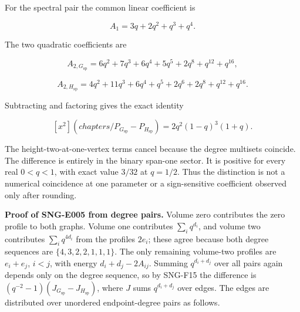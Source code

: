 \documentclass[
  11pt,
  a4paper,
]{report}
\begin{document}
For the spectral pair the common linear coefficient is

\[
A_1=3q+2q^2+q^3+q^4.
\]

The two quadratic coefficients are

\[
A_{2,G_{\mathrm{sp}}}=6q^2+7q^3+6q^4+5q^5+2q^8+q^{12}+q^{16},
\]

\[
A_{2,H_{\mathrm{sp}}}=4q^2+11q^3+6q^4+q^5+2q^6+2q^8+q^{12}+q^{16}.
\]

Subtracting and factoring gives the exact identity

\[
\boxed{[x^2](chapters/P_{G_{\mathrm{sp}}}-P_{H_{\mathrm{sp}}})
=2q^2(1-q)^3(1+q).}
\tag{SNG-E005}
\]

The height-two-at-one-vertex terms cancel because the degree multisets
coincide. The difference is entirely in the binary span-one sector. It
is positive for every real \(0<q<1\), with exact value \(3/32\) at
\(q=1/2\). Thus the distinction is not a numerical coincidence at one
parameter or a sign-sensitive coefficient observed only after rounding.

\textbf{Proof of SNG-E005 from degree pairs.} Volume zero contributes
the zero profile to both graphs. Volume one contributes
\(\sum_iq^{d_i}\), and volume two contributes \(\sum_iq^{4d_i}\) from
the profiles \(2e_i\); these agree because both degree sequences are
\(\{4,3,2,2,1,1,1\}\). The only remaining volume-two profiles are
\(e_i+e_j\), \(i<j\), with energy \(d_i+d_j-2A_{ij}\). Summing
\(q^{d_i+d_j}\) over all pairs again depends only on the degree
sequence, so by SNG-F15 the difference is
\((q^{-2}-1)(J_{G_{\mathrm{sp}}}-J_{H_{\mathrm{sp}}})\), where \(J\)
sums \(q^{d_i+d_j}\) over edges. The edges are distributed over
unordered endpoint-degree pairs as follows.
\end{document}
